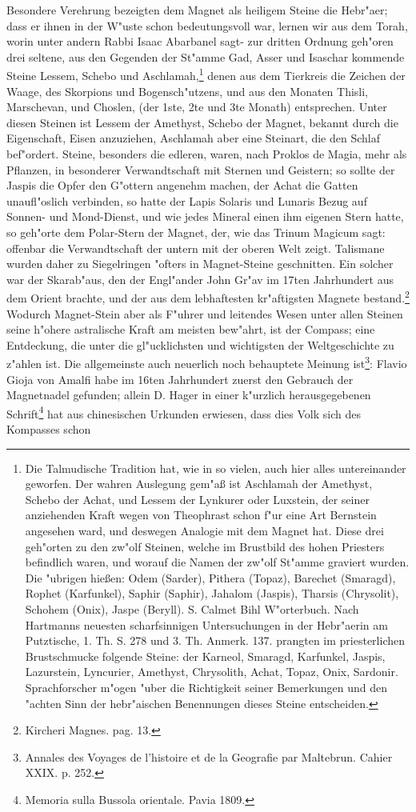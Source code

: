 \documentclass[a4paper, 11pt, oneside, polutonikogreek, german]{article}
\begin{document}
Besondere Verehrung bezeigten dem Magnet als heiligem Steine die Hebr"aer; dass er ihnen in der W"uste schon bedeutungsvoll war, lernen wir aus dem Torah, worin unter andern Rabbi Isaac Abarbanel sagt- zur dritten Ordnung geh"oren drei seltene, aus den Gegenden der St"amme Gad, Asser und Isaschar kommende Steine Lessem, Schebo und Aschlamah,\footnote{Die Talmudische Tradition hat, wie in so vielen, auch hier alles untereinander geworfen. Der wahren Auslegung gem"aß ist Aschlamah der Amethyst, Schebo der Achat, und Lessem der Lynkurer oder Luxstein, der seiner anziehenden Kraft wegen von Theophrast schon f"ur eine Art Bernstein angesehen ward, und deswegen Analogie mit dem Magnet hat. Diese drei geh"orten zu den zw"olf Steinen, welche im Brustbild des hohen Priesters befindlich waren, und worauf die Namen der zw"olf St"amme graviert wurden. Die "ubrigen hießen: Odem (Sarder), Pithera (Topaz), Barechet (Smaragd), Rophet (Karfunkel), Saphir (Saphir), Jahalom (Jaspis), Tharsis (Chrysolit), Schohem (Onix), Jaspe (Beryll). S. Calmet Bihl W"orterbuch. Nach Hartmanns neuesten scharfsinnigen Untersuchungen in der Hebr"aerin am Putztische, 1. Th. S. 278 und 3. Th. Anmerk. 137. prangten im priesterlichen Brustschmucke folgende Steine: der Karneol, Smaragd, Karfunkel, Jaspis, Lazurstein, Lyncurier, Amethyst, Chrysolith, Achat, Topaz, Onix, Sardonir. Sprachforscher m"ogen "uber die Richtigkeit seiner Bemerkungen und den "achten Sinn der hebr"aischen Benennungen dieses Steine entscheiden.} denen aus dem Tierkreis die Zeichen der Waage, des Skorpions und Bogensch"utzens, und aus den Monaten Thisli, Marschevan, und Choslen, (der 1ste, 2te und 3te Monath) entsprechen. Unter diesen Steinen ist Lessem der Amethyst, Schebo der Magnet, bekannt durch die Eigenschaft, Eisen anzuziehen, Aschlamah aber eine Steinart, die den Schlaf bef"ordert. Steine, besonders die edleren, waren, nach Proklos de Magia, mehr als Pflanzen, in besonderer Verwandtschaft mit Sternen und Geistern; so sollte der Jaspis die Opfer den G"ottern angenehm machen, der Achat die Gatten unaufl"oslich verbinden, so hatte der Lapis Solaris und Lunaris Bezug auf Sonnen- und Mond-Dienst, und wie jedes Mineral einen ihm eigenen Stern hatte, so geh"orte dem Polar-Stern der Magnet, der, wie das Trinum Magicum sagt: offenbar die Verwandtschaft der untern mit der oberen Welt zeigt. Talismane wurden daher zu Siegelringen "ofters in Magnet-Steine geschnitten. Ein solcher war der Skarab"aus, den der Engl"ander John Gr"av im 17ten Jahrhundert aus dem Orient brachte, und der aus dem lebhaftesten kr"aftigsten Magnete bestand.\footnote{Kircheri Magnes. pag. 13.} Wodurch Magnet-Stein aber als F"uhrer und leitendes Wesen unter allen Steinen seine h"ohere astralische Kraft am meisten bew"ahrt, ist der Compass; eine Entdeckung, die unter die gl"ucklichsten und wichtigsten der Weltgeschichte zu z"ahlen ist. Die allgemeinste auch neuerlich noch behauptete Meinung ist\footnote{Annales des Voyages de l'histoire et de la Geografie par Maltebrun. Cahier XXIX. p. 252.}: Flavio Gioja von Amalfi habe im 16ten Jahrhundert zuerst den Gebrauch der Magnetnadel gefunden; allein D. Hager in einer k"urzlich herausgegebenen Schrift\footnote{Memoria sulla Bussola orientale. Pavia 1809.} hat aus chinesischen Urkunden erwiesen, dass dies Volk sich des Kompasses schon 
\end{document}
